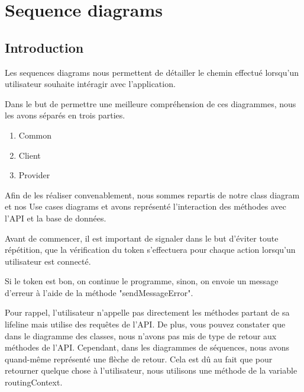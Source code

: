 \section{Sequence diagrams}

\subsection{Introduction}

\begin{flushleft}
Les sequences diagrams nous permettent de détailler le chemin effectué lorsqu'un utilisateur souhaite intéragir avec l'application.
\end{flushleft}

\begin{flushleft}
Dans le but de permettre une meilleure compréhension de ces diagrammes, nous les avons séparés en trois parties.
\begin{enumerate}
\item Common
\item Client
\item Provider
\end{enumerate}
\end{flushleft}

\begin{flushleft}
Afin de les réaliser convenablement, nous sommes repartis de notre class diagram et nos Use cases diagrams et avons représenté l'interaction des méthodes avec l'API et la base de données.
\end{flushleft}

\begin{flushleft}
Avant de commencer, il est important de signaler dans le but d'éviter toute répétition, que la vérification du token s'effectuera pour chaque action lorsqu'un utilisateur est connecté.
\end{flushleft}

\begin{flushleft}
Si le token est bon, on continue le programme, sinon, on envoie un message d'erreur à l'aide de la méthode "sendMessageError".
\end{flushleft}

\begin{flushleft}
Pour rappel, l'utilisateur n'appelle pas directement les méthodes partant de sa lifeline mais utilise des requêtes de l'API. De plus, vous pouvez constater que dans le diagramme des classes, nous n'avons pas mis de type de retour aux méthodes de l'API. Cependant, dans les diagrammes de séquences, nous avons quand-même représenté une flèche de retour. Cela est dû au fait que pour retourner quelque chose à l'utilisateur, nous utilisons une méthode de la variable routingContext.
\end{flushleft}

